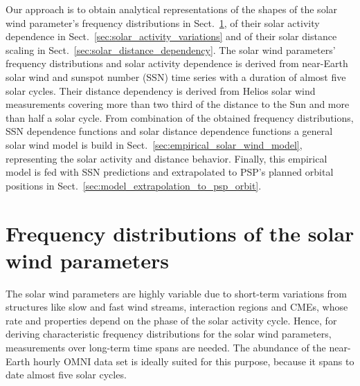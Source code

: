 Our approach is to obtain analytical representations of the shapes of the solar wind parameter’s frequency distributions in Sect.~\ref{sec:frequency_distribution}, of their solar activity dependence in Sect.~\ref{sec:solar_activity_variations} and of their solar distance scaling in Sect.~\ref{sec:solar_distance_dependency}. The solar wind parameters’ frequency distributions and solar activity dependence is derived from near-Earth solar wind and sunspot number (SSN) time series with a duration of almost five solar cycles. Their distance dependency is derived from Helios solar wind measurements covering more than two third of the distance to the Sun and more than half a solar cycle. From combination of the obtained frequency distributions, SSN dependence functions and solar distance dependence functions a general solar wind model is build in Sect.~\ref{sec:empirical_solar_wind_model}, representing the solar activity and distance behavior. Finally, this empirical model is fed with SSN predictions and extrapolated to PSP's planned orbital positions in Sect.~\ref{sec:model_extrapolation_to_psp_orbit}.


\section{Frequency distributions of the solar wind parameters}
\label{sec:frequency_distribution}
The solar wind parameters are highly variable due to short-term variations from structures like slow and fast wind streams, interaction regions and CMEs, whose rate and properties depend on the phase of the solar activity cycle. Hence, for deriving characteristic frequency distributions for the solar wind parameters, measurements over long-term time spans are needed. The abundance of the near-Earth hourly OMNI data set is ideally suited for this purpose, because it spans to date almost five solar cycles.

